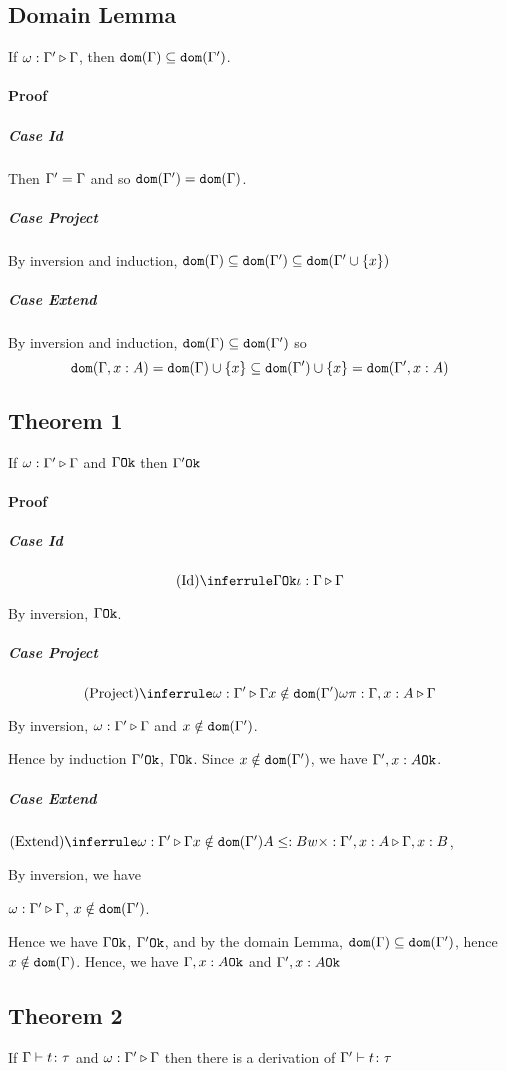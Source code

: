 {    \subsection{Domain Lemma}
    If $\omega : \Gamma' \triangleright \Gamma$, then $\texttt{dom}(\Gamma)\subseteq \texttt{dom}(\Gamma')$.
    
    \paragraph{Proof}
    \subparagraph{Case Id}
    Then $\Gamma' = \Gamma$ and so $\texttt{dom}(\Gamma') = \texttt{dom}(\Gamma)$.
    \subparagraph{Case Project}
    By inversion and induction, $\texttt{dom}(\Gamma)\subseteq\texttt{dom}(\Gamma')\subseteq\texttt{dom}(\Gamma'\cup\left\{x\right\})$
    \subparagraph{Case Extend}
    By inversion and induction, $\texttt{dom}(\Gamma)\subseteq\texttt{dom}(\Gamma')$ so 
    $$\texttt{dom}(\Gamma, x: A) = \texttt{dom}(\Gamma)\cup\left\{x\right\} \subseteq\texttt{dom}(\Gamma')\cup\left\{x\right\} = \texttt{dom}(\Gamma',x:A)$$
    \subsection{Theorem 1}
    If $\omega : \Gamma' \triangleright \Gamma$ and $\Gamma \texttt{Ok}$ then $\Gamma' \texttt{Ok}$
    \paragraph{Proof}
    \subparagraph{Case Id}
    $$\ntreeruleI{Id}{\ok{\G}}{\wrel{\i}{\G}{\G}}$$
    
    By inversion, $\Gamma \texttt{Ok}$.
    
    \subparagraph{Case Project}
    $$\ntreeruleII{Project}{\wrel{\w}{\G'}{\G}}{ x \notin \dom{\G'}}{\wrel{\w \pi}{\G, x: A}{\G}}$$
    
    By inversion, $\omega : \Gamma' \triangleright \Gamma$ and $x\notin \texttt{dom}(\Gamma')$.
    
    Hence by induction $\Gamma' \texttt{Ok}$, $\Gamma \texttt{Ok}$. Since $x\notin\texttt{dom}(\Gamma')$, we have $\Gamma', x:A \texttt{Ok}$.
    
    \subparagraph{Case Extend}
    $\ntreeruleIII{Extend}{\wrel{\w}{\G'}{\G}}{ x \notin \dom{\G'}}{ A \subtype B}{\wrel{w \x}{\G', x: A}{\G, x: B}}$, 
    
    By inversion, we have 
    
    $\omega : \Gamma' \triangleright \Gamma$, $x\notin\texttt{dom}(\Gamma')$.
    
    Hence we have $\Gamma \texttt{Ok}$, $\Gamma' \texttt{Ok}$, and by the domain Lemma, $\texttt{dom}(\Gamma)\subseteq\texttt{dom}(\Gamma')$, hence $x\notin\texttt{dom}(\Gamma)$. Hence, we have $\Gamma, x: A \texttt{Ok}$ and $\Gamma',x:A \texttt{Ok}$
    
    
    \subsection{Theorem 2}
    If $\Gamma \vdash t \colon \tau$ and $\omega : \Gamma' \triangleright \Gamma$ then there is a derivation of $\Gamma' \vdash t \colon \tau$
    
}
